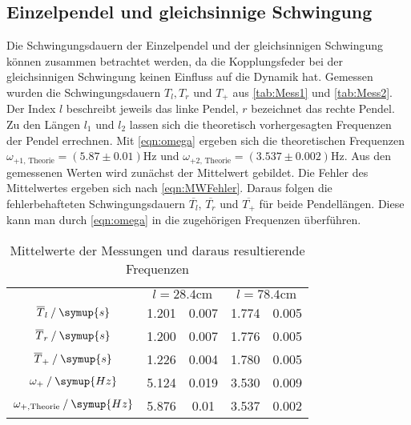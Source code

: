 \subsection{Einzelpendel und gleichsinnige Schwingung}
\label{subsec:Gleichsinnig}
Die Schwingungsdauern der Einzelpendel und der gleichsinnigen Schwingung können zusammen betrachtet werden, da die Kopplungsfeder bei der gleichsinnigen Schwingung 
keinen Einfluss auf die Dynamik hat. Gemessen wurden die Schwingungsdauern $T_l, T_r$ und $T_+$ aus \autoref{tab:Mess1} und \autoref{tab:Mess2}.
Der Index $l$ beschreibt jeweils das linke Pendel, $r$ bezeichnet das rechte Pendel. Zu den Längen $l_1$ und $l_2$ lassen sich die 
theoretisch vorhergesagten Frequenzen der Pendel errechnen. Mit \autoref{eqn:omega} ergeben sich die theoretischen Frequenzen $\omega_{+1\text{, Theorie}} = (5.87\pm 0.01)\unit{\hertz}$ und 
$\omega_{+2\text{, Theorie}} = (3.537\pm 0.002)\unit{\hertz}$. Aus den gemessenen Werten wird zunächst der Mittelwert gebildet. Die Fehler des Mittelwertes ergeben sich nach \autoref{eqn:MWFehler}.
Daraus folgen die fehlerbehafteten Schwingungsdauern $\overline{T_l}$, $\overline{T_r}$ und $\overline{T_+}$ für beide Pendellängen. Diese kann man durch \autoref{eqn:omega} in 
die zugehörigen Frequenzen überführen.
\begin{table}
    \centering
    \caption{Mittelwerte der Messungen und daraus resultierende Frequenzen}
    \begin{tabular}{c S @{${}\pm{}$} S S @{${}\pm{}$} S}
    \toprule
    &  &  \\
    \cmidrule(lr){2-3}\cmidrule(lr){4-5}
    {$\overline{T}_l \mathbin{/} \symup{s}$}                & 1.201 & 0.007 & 1.774 & 0.005 \\
    {$\overline{T}_r \mathbin{/} \symup{s}$}                & 1.200 & 0.007 & 1.776 & 0.005 \\
    {$\overline{T}_+ \mathbin{/} \symup{s}$}                & 1.226 & 0.004 & 1.780 & 0.005 \\
    {$\omega_+ \mathbin{/} \symup{Hz}$}                     & 5.124 & 0.019 & 3.530 & 0.009 \\
    {$\omega_{+,\text{Theorie}} \mathbin{/} \symup{Hz}$}    & 5.876 & 0.01  & 3.537 & 0.002 \\
    \bottomrule
    \end{tabular}
\end{table}    

